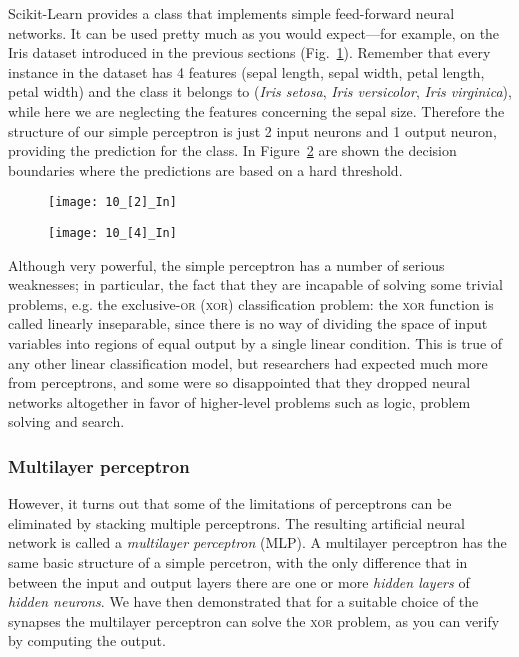 Scikit-Learn provides a  class that implements simple feed-forward neural networks. It can be used pretty much as you would expect—for example, on the Iris dataset introduced in the previous sections (Fig.~\ref{10_[2]_In}). Remember that every instance in the dataset has 4 features (sepal length, sepal width, petal length, petal width) and the class it belongs to (\emph{Iris setosa}, \emph{Iris versicolor}, \emph{Iris virginica}), while here we are neglecting the features concerning the sepal size. Therefore the structure of our simple perceptron is just 2 input neurons and 1 output neuron, providing the prediction for the class. In Figure~\ref{10_[4]_In} are shown the decision boundaries where the predictions are based on a hard threshold.
\begin{figure}[h!t]
\centering
\texttt{[image: 10\_[2]\_In]}
\caption{}\label{10_[2]_In}
\end{figure}
\begin{figure}[h!t]
\centering
\texttt{[image: 10\_[4]\_In]}
\caption{}\label{10_[4]_In}
\end{figure}

Although very powerful, the simple perceptron has a number of serious weaknesses; in particular, the fact that they are incapable of solving some trivial problems, e.g. the exclusive-\textsc{or} (\textsc{xor}) classification problem: the \textsc{xor} function is called linearly inseparable, since there is no way of dividing the space of input variables into regions of equal output by a single linear condition. This is true of any other linear classification model, but researchers had expected much more from perceptrons, and some were so disappointed that they dropped neural networks altogether in favor of higher-level problems such as logic, problem solving and search.

\subsubsection*{Multilayer perceptron}
However, it turns out that some of the limitations of perceptrons can be eliminated by stacking multiple perceptrons. The resulting artificial neural network is called a \emph{multilayer perceptron} (MLP). A multilayer perceptron has the same basic structure of a simple percetron, with the only difference that in between the input and output layers there are one or more \emph{hidden layers} of \emph{hidden neurons}. We have then demonstrated that for a suitable choice of the synapses the multilayer perceptron can solve the \textsc{xor} problem, as you can verify by computing the output.

